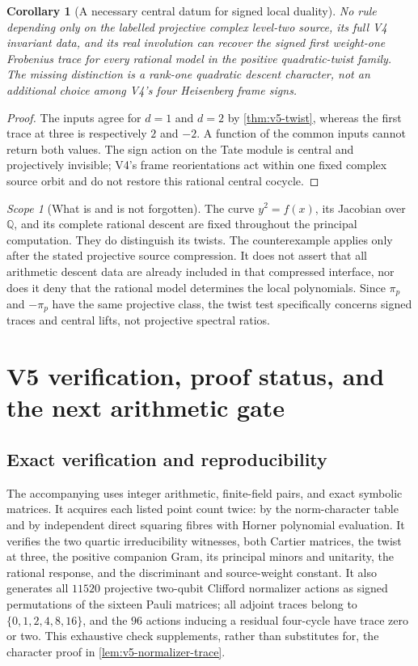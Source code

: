 \documentclass[11pt]{article}
\newtheorem{corollary}[corollary]{Corollary}
\theoremstyle{definition}
\theoremstyle{remark}
\newtheorem{scope}[scope]{Scope}
\newcommand{\Q}{\mathbb Q}
\begin{document}
\begin{corollary}[A necessary central datum for signed local duality]
\label{cor:v5-central-datum}
No rule depending only on the labelled projective complex level-two
source, its full V4 invariant data, and its real involution can recover
the signed first weight-one Frobenius trace for every rational model in
the positive quadratic-twist family. The missing distinction is a
rank-one quadratic descent character, not an additional choice among
V4's four Heisenberg frame signs.
\end{corollary}
\begin{proof}
The inputs agree for $d=1$ and $d=2$ by
\cref{thm:v5-twist}, whereas the first trace at three is respectively
$2$ and $-2$. A function of the common inputs cannot return both values.
The sign action on the Tate module is central and projectively invisible;
V4's frame reorientations act within one fixed complex source orbit and
do not restore this rational central cocycle.
\end{proof}

\begin{scope}[What is and is not forgotten]
The curve $y^2=f(x)$, its Jacobian over $\Q$, and its complete rational
descent are fixed throughout the principal computation. They do distinguish
its twists. The counterexample applies only after the stated projective
source compression. It does not assert that all arithmetic descent data
are already included in that compressed interface, nor does it deny that
the rational model determines the local polynomials. Since $\pi_p$ and
$-\pi_p$ have the same projective class, the twist test specifically
concerns signed traces and central lifts, not projective spectral ratios.
\end{scope}

\section{V5 verification, proof status, and the next arithmetic gate}
\label{sec:v5-status}

\subsection{Exact verification and reproducibility}
The accompanying 
uses integer arithmetic, finite-field pairs, and exact symbolic matrices.
It acquires each listed point count twice: by the norm-character table and
by independent direct squaring fibres with Horner polynomial evaluation.
It verifies the two quartic irreducibility witnesses, both Cartier matrices,
the twist at three, the positive companion Gram, its principal minors and
unitarity, the rational response, and the discriminant and source-weight
constant. It also generates all $11520$ projective two-qubit Clifford
normalizer actions as signed permutations of the sixteen Pauli matrices;
all adjoint traces belong to $\{0,1,2,4,8,16\}$, and the $96$ actions
inducing a residual four-cycle have trace zero or two. This exhaustive
check supplements, rather than substitutes for, the character proof in
\cref{lem:v5-normalizer-trace}.
\end{document}
